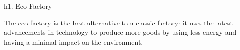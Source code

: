 h1. Eco Factory

The eco factory is the best alternative to a classic factory: it uses the latest advancements in technology to produce more goods by using less energy and having a minimal impact on the environment.